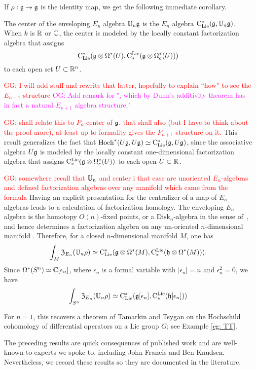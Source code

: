 \documentclass[11pt]{amsart}
\numberwithin{equation}{section}
\def\owen{\textcolor{magenta}{OG: }\textcolor{magenta}}
\def\greg{\textcolor{red}{GG: }\textcolor{red}}
\begin{document}
If $\rho: \mathfrak g \to \mathfrak g$ is the identity map, we get the following immediate corollary.

\begin{cor}
\label{thm: center}
The center of the enveloping $E_n$ algebra $\mathbb U_n\mathfrak g$ is the $E_n$ algebra ${\rm C}_{\rm Lie}^*(\mathfrak g, \mathbb U_n\mathfrak g)$. 
When $k$ is $\mathbb R$ or $\mathbb C$, the 
center is modeled by the locally constant factorization algebra that assigns
\[
{\rm C}_{\rm Lie}^*(\mathfrak g \otimes \Omega^*(U), {\rm C}^{\rm Lie}_*( \mathfrak g \otimes \Omega^*_c(U)))
\]
to each open set $U \subset \mathbb R^n$.
\end{cor}
\greg{I will add stuff and rewrite that latter, hopefully to explain ``how'' to see the $E_{n+1}$-structure}
\owen{Add remark for ", which by Dunn's additivity theorem has in fact a natural $E_{n+1}$ algebra structure."}

\greg{shall relate this to $P_n$-center of $\mathfrak g$. that shall also (but I have to think about the proof more), 
at least up to formality gives the $P_{n+1}$-structure on it. }
This result generalizes the fact that ${\rm Hoch}^*(U\mathfrak g,U\mathfrak g) \simeq {\rm C}_{\rm Lie}^*(\mathfrak g, U\mathfrak g)$, 
since the associative algebra $U\mathfrak g$ is modeled by the locally constant one-dimensional factorization algebra that assigns
${\rm C}^{\rm Lie}_* (\mathfrak g \otimes \Omega^*_c(U))$ to each open $U \subset \mathbb R$. 

\greg{somewhere recall that $\mathbb U_n$ and center i that case are unoriented $E_n$-algebras and defined factorization algebras over any manifold which came from the formula}
Having an explicit presentation for the centralizer of a map of $E_n$ algebras leads to a calculation of factorization homology.
The enveloping $E_n$ algebra is the homotopy $O(n)$-fixed points, or a $\mathrm{Disk}_n$-algebra in the sense of~\cite{AF},
and hence determines a factorization algebra on any un-oriented $n$-dimensional manifold \cite{Knudsen}.
Therefore, for a closed $n$-dimensional manifold $M$, one has
\[
\int_M {\frak Z}_{E_n}(\mathbb U_n \rho) \simeq {\rm C}_{\rm Lie}^*(\mathfrak g \otimes \Omega^*(M), {\rm C}^{\rm Lie}_*( \mathfrak h \otimes \Omega^*(M))).
\]
Since $\Omega^*(S^n) \simeq \mathbb C[\epsilon_n]$, where $\epsilon_n$ is a formal variable with $|\epsilon_n| = n$ and $\epsilon_n^2 = 0$, we have
\[
\int_{S^n} {\frak Z}_{E_n}(\mathbb U_n \rho) \simeq {\rm C}_{\rm Lie}^*(\mathfrak g[\epsilon_n], {\rm C}^{\rm Lie}_*( \mathfrak h[\epsilon_n]))
\]

For $n=1$, this recovers a theorem of Tamarkin and Tsygan \cite{TT} on the Hochschild cohomology of differential operators on a Lie group $G$;
see Example \ref{eg: TT}. 

\begin{rmk}
The preceding results are quick consequences of published work and are well-known to experts we spoke to, including John Francis and Ben Knudsen. 
Nevertheless, we record these results so they are documented in the literature.
\end{rmk}
\end{document}

